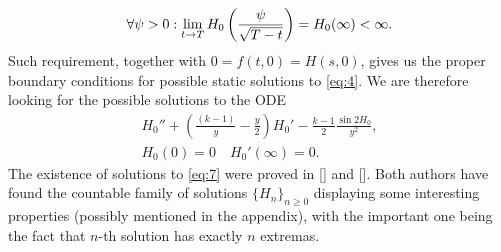 \begin{align}
  \label{eq:1}
  \forall{\psi>0}:\lim_{t\rightarrow
    T}H_0\left(\frac{\psi}{\sqrt{T-t}}\right)=H_0(\infty)<\infty.
\end{align}
Such requirement, together with $0=f(t,0)=H(s,0)$, gives us the proper
boundary conditions for possible static solutions to \eqref{eq:4}. We
are therefore looking for the possible solutions to the ODE
\begin{align}
  \label{eq:7}
  H_0''+\left(\frac{(k-1)}{y}-\frac{y}{2}\right)H_0'-\frac{k-1}{2}\frac{\sin2H_0}{y^2},\\
  H_0(0)=0\quad H_0'(\infty)=0.
\end{align}
The existence of solutions to \eqref{eq:7} were proved in [] and
[]. Both authors have found the countable family of solutions
$\{H_n\}_{n\ge0}$ displaying some interesting properties (possibly
mentioned in the appendix), with the important one being the fact that
$n$-th solution has exactly $n$ extremas.\\

